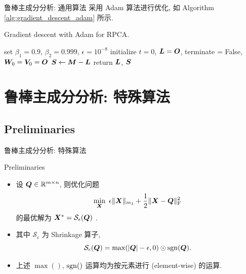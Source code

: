 \documentclass{beamer}
\begin{document}
\begin{frame}{鲁棒主成分分析: 通用算法}
  采用 Adam \cite{kingma2014adam} 算法进行优化, 如 Algorithm \ref{alg:gradient_descent_adam} 所示.
  \begin{algorithm}[H]
    \small
    \label{alg:gradient_descent_adam}
    \caption{Gradient descent with Adam for RPCA.}
    set $\beta_1=0.9$, $\beta_2=0.999$, $\epsilon=10^{-8}$\;
    initialize $t=0$, $\bm{L}=\bm{O}$, terminate = False, $\bm{W}_0=\bm{V}_0=\bm{O}$\;
    $\bm{S} \leftarrow \bm{M}-\bm{L}$\;
    return $\bm{L}$, $\bm{S}$\;
  \end{algorithm}
\end{frame}

\section[RPCA: 特殊算法]{鲁棒主成分分析: 特殊算法}
\label{sec:rpca_special}

\subsection{Preliminaries}

\begin{frame}{鲁棒主成分分析: 特殊算法}
  \begin{block}{Preliminaries}
    \begin{itemize}
      \item 设 $\bm{Q}\in\mathbb{R}^{m\times n}$, 则优化问题
      \begin{equation}
        \min_{\bm{X}}~\epsilon\|\bm{X}\|_{m_1}+\frac{1}{2}\|\bm{X}-\bm{Q}\|_{\text{F}}^2
      \end{equation}
      的最优解为 $\bm{X}^*=\mathcal{S}_\epsilon(\bm{Q})$ \cite{candes2011robust}.
      \item 其中 $\mathcal{S}_\epsilon$ 为 Shrinkage 算子,
      \begin{equation}
        \mathcal{S}_\epsilon(\bm{Q})=\max(|\bm{Q}|-\epsilon, 0)\odot\operatorname{sgn}(\bm{Q}).
      \end{equation}
      \item 上述 $\max()$, $\operatorname{sgn}()$ 运算均为按元素进行 (element-wise) 的运算.
    \end{itemize}
  \end{block}
\end{frame}
\end{document}
